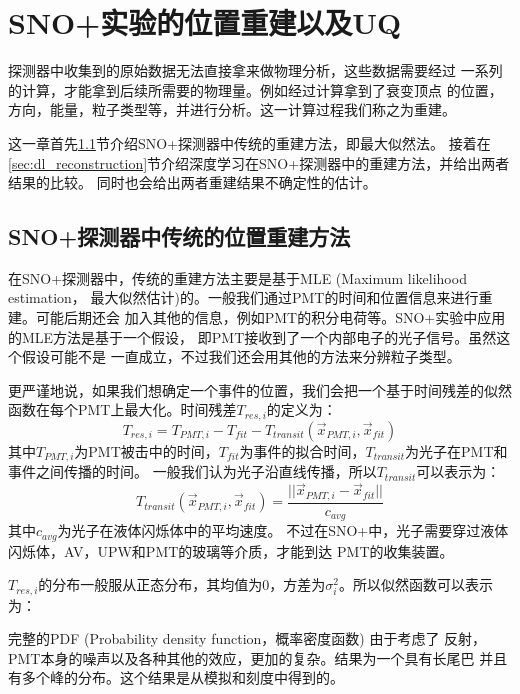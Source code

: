 \chapter{SNO+实验的位置重建以及UQ}

探测器中收集到的原始数据无法直接拿来做物理分析，这些数据需要经过
一系列的计算，才能拿到后续所需要的物理量。例如经过计算拿到了衰变顶点
的位置，方向，能量，粒子类型等，并进行分析。这一计算过程我们称之为重建。

这一章首先\ref{sec:classical_reconstruction}节介绍SNO+探测器中传统的重建方法，即最大似然法。
接着在\ref{sec:dl_reconstruction}节介绍深度学习在SNO+探测器中的重建方法，并给出两者结果的比较。
同时也会给出两者重建结果不确定性的估计。

\section{SNO+探测器中传统的位置重建方法}\label{sec:classical_reconstruction}

在SNO+探测器中，传统的重建方法主要是基于MLE (Maximum likelihood estimation，
最大似然估计)的。一般我们通过PMT的时间和位置信息来进行重建。可能后期还会
加入其他的信息，例如PMT的积分电荷等。SNO+实验中应用的MLE方法是基于一个假设，
即PMT接收到了一个内部电子的光子信号。\cite{anderson2024}虽然这个假设可能不是
一直成立，不过我们还会用其他的方法来分辨粒子类型。

更严谨地说，如果我们想确定一个事件的位置，我们会把一个基于时间残差的似然
函数在每个PMT上最大化。时间残差$T_{res,i}$的定义为：
\begin{equation}
T_{res,i} = T_{PMT,i}-T_{fit}-T_{transit}(\vec{x}_{PMT,i},\vec{x}_{fit})
\label{eq:residual}
\end{equation}
其中$T_{PMT,i}$为PMT被击中的时间，$T_{fit}$为事件的拟合时间，$T_{transit}$为光子在PMT和事件之间传播的时间。
一般我们认为光子沿直线传播，所以$T_{transit}$可以表示为：
\begin{equation}
T_{transit}(\vec{x}_{PMT,i},\vec{x}_{fit}) = \frac{||\vec{x}_{PMT,i}-\vec{x}_{fit}||}{c_{avg}}
\end{equation}
其中$c_{avg}$为光子在液体闪烁体中的平均速度。
不过在SNO+中，光子需要穿过液体闪烁体，AV，UPW和PMT的玻璃等介质，才能到达
PMT的收集装置。

$T_{res,i}$的分布一般服从正态分布，其均值为0，方差为$\sigma_{i}^2$。所以似然函数可以表示为：

完整的PDF (Probability density function，概率密度函数) 由于考虑了
反射，PMT本身的噪声以及各种其他的效应，更加的复杂。结果为一个具有长尾巴
并且有多个峰的分布。这个结果是从模拟和刻度中得到的。\cite{anderson2024}


